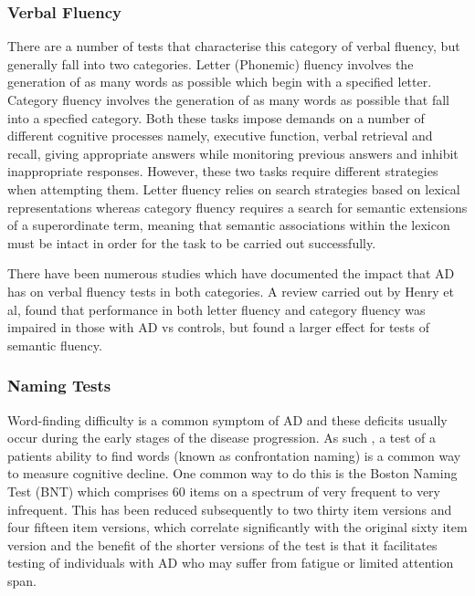 \documentclass{article}
\begin{document}
\subsubsection{Verbal Fluency}
There are a number of tests that characterise this category of verbal fluency, but generally fall into two categories. Letter (Phonemic) fluency involves the generation of as many words as possible which begin with a specified letter. Category fluency involves the generation of as many words as possible that fall into a specfied category. Both these tasks impose demands on a number of different cognitive processes namely, executive function, verbal retrieval and recall, giving appropriate answers while monitoring previous answers and inhibit inappropriate responses. However, these two tasks require different strategies when attempting them. Letter fluency relies on search strategies based on lexical representations whereas category fluency requires a search for semantic extensions of a superordinate term, meaning that semantic associations within the lexicon must be intact in order for the task to be carried out successfully. \par  
There have been numerous studies which have documented the impact that AD has on verbal fluency tests in both categories. A review carried out by Henry et al, found that performance in both letter fluency and category fluency was impaired in those with AD vs controls, but found a larger effect for tests of semantic fluency.
\subsubsection{Naming Tests}
Word-finding difficulty is a common symptom of AD and these deficits usually occur during the early stages of the disease progression. As such , a test of a patients ability to find words (known as confrontation naming) is a common way to measure cognitive decline. One common way to do this is the Boston Naming Test (BNT) which comprises 60 items on a spectrum of very frequent to very infrequent. This has been reduced subsequently to two thirty item versions and four fifteen item versions, which correlate significantly with the original sixty item version and the benefit of the shorter versions of the test is that it facilitates testing of individuals with AD who may suffer from fatigue or limited attention span. 
\end{document}
